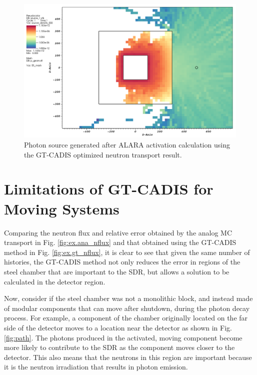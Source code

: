 \begin{figure} 
	\includegraphics[scale=0.4]{figs/gtcadis_photon_src_g1.png}
	\caption [GT-CADIS photon source]
	{Photon source generated after ALARA activation calculation using the
	GT-CADIS optimized neutron transport result.\label{fig:ex.gt_psrc}}
\end{figure}




\section{Limitations of GT-CADIS for Moving Systems}

Comparing the neutron flux and relative error obtained by the analog MC 
transport in Fig. \ref{fig:ex.ana_nflux}  and that obtained using the GT-CADIS
method in Fig. 
\ref{fig:ex.gt_nflux}, it is clear to see that given the same number of
histories, the GT-CADIS method not only reduces the error in regions of the
steel chamber that are important to the SDR, but allows a solution to be
calculated in the detector region.


Now, consider if the steel
chamber was not a monolithic block, and instead
made of modular components that can move after shutdown, during the
photon decay process.
For example,
a component of the chamber originally located on the far side of the detector moves to a
location near the detector as shown in Fig. \ref{fig:path}.
The photons produced in the activated, moving component become more likely to contribute to
the SDR as the component moves closer to the detector.  This also means that the neutrons in
this region are important because it is the neutron irradiation that results
in photon emission.

